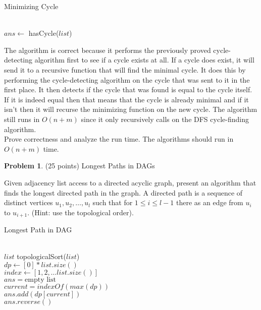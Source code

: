 \documentclass[11pt]{article}
\theoremstyle{definition}
\theoremstyle{theorem}
\newtheorem{prob}{Problem}
\begin{document}
\begin{algorithm}[H]
\caption{Minimizing Cycle}
 \\ {
    $ans \gets$ hasCycle($list$) \\
}
\end{algorithm}
The algorithm is correct because it performs the previously proved cycle-detecting algorithm first to see if a cycle exists at all. If a cycle does exist, it will send it to a recursive function that will find the minimal cycle. It does this by performing the cycle-detecting algorithm on the cycle that was sent to it in the first place. It then detects if the cycle that was found is equal to the cycle itself. If it is indeed equal then that means that the cycle is already minimal and if it isn't then it will recurse the minimizing function on the new cycle. The algorithm still runs in $O(n + m)$ since it only recursively calls on the DFS cycle-finding algorithm. \\

 Prove correctness and analyze the run time. The algorithms should run in $O(n + m)$ time.

\newpage

\begin{prob}
    (25 points) Longest Paths in DAGs
\end{prob}


Given adjacency list access to a directed acyclic graph, present an algorithm that finds the longest directed path in the graph.
A directed path is a sequence of distinct vertices $u_1, u_2, \ldots, u_l$
such that for $1 \leq i \leq l - 1$ there as an edge from $u_i$ to $u_{i+1}$.
(Hint: use the topological order).
\begin{algorithm}[H]
\caption{Longest Path in DAG}
 \\ {
    $list$ \gets topologicalSort($list$) \\
    $dp \gets [0] * list.size()$ \\
    $index \gets [1, 2, \ldots list.size()]$ \\
    $ans = \text{empty list}$ \\
    $current = indexOf(max(dp))$ \\
    $ans.add(dp[current])$ \\
    \Return $ans.reverse()$
}
\end{algorithm}
\end{document}
